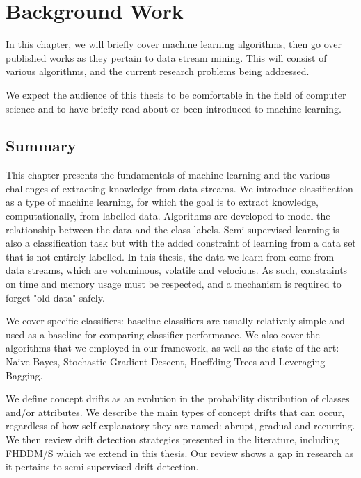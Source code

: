 
\chapter{Background Work} %

\label{chapter:background_work} %
In this chapter, we will briefly cover machine learning algorithms, then go over published works as they pertain to data stream mining. This will consist of various algorithms, and the current research problems being addressed.

We expect the audience of this thesis to be comfortable in the field of computer science and to have briefly read about or been introduced to machine learning.

\section{Summary}
This chapter presents the fundamentals of machine learning and the various challenges of extracting knowledge from data streams. We introduce classification as a type of machine learning, for which the goal is to extract knowledge, computationally, from labelled data. Algorithms are developed to model the relationship between the data and the class labels. Semi-supervised learning is also a classification task but with the added constraint of learning from a data set that is not entirely labelled. In this thesis, the data we learn from come from data streams, which are voluminous, volatile and velocious. As such, constraints on time and memory usage must be respected, and a mechanism is required to forget "old data" safely.

We cover specific classifiers: baseline classifiers are usually relatively simple and used as a baseline for comparing classifier performance. We also cover the algorithms that we employed in our framework, as well as the state of the art: Naive Bayes, Stochastic Gradient Descent, Hoeffding Trees and Leveraging Bagging.

We define concept drifts as an evolution in the probability distribution of classes and/or attributes. We describe the main types of concept drifts that can occur, regardless of how self-explanatory they are named: abrupt, gradual and recurring. We then review drift detection strategies presented in the literature, including FHDDM/S which we extend in this thesis. Our review shows a gap in research as it pertains to semi-supervised drift detection.

